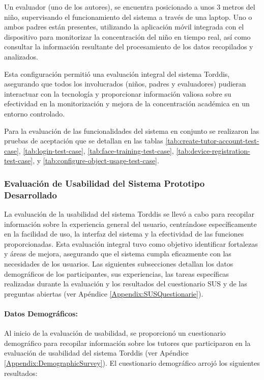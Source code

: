 Un evaluador (uno de los autores), se encuentra posicionado a unos 3 metros del niño, supervisando el funcionamiento del sistema a través de una laptop. Uno o ambos padres están presentes, utilizando la aplicación móvil integrada con el dispositivo para monitorizar la concentración del niño en tiempo real, así como consultar la información resultante del procesamiento de los datos recopilados y analizados.

Esta configuración permitió una evaluación integral del sistema Torddis, asegurando que todos los involucrados (niños, padres y evaluadores) pudieran interactuar con la tecnología y proporcionar información valiosa sobre su efectividad en la monitorización y mejora de la concentración académica en un entorno controlado.

Para la evaluación de las funcionalidades del sistema en conjunto se realizaron las pruebas de aceptación que se detallan en las tablas \ref{tab:create-tutor-account-test-case}, \ref{tab:login-test-case}, \ref{tab:face-training-test-case}, \ref{tab:device-registration-test-case}, y \ref{tab:configure-object-usage-test-case}.

\subsubsection*{Evaluación de Usabilidad del Sistema Prototipo Desarrollado}
La evaluación de la usabilidad del sistema Torddis se llevó a cabo para recopilar información sobre la experiencia general del usuario, centrándose específicamente en la facilidad de uso, la interfaz del sistema y la efectividad de las funciones proporcionadas. Esta evaluación integral tuvo como objetivo identificar fortalezas y áreas de mejora, asegurando que el sistema cumpla eficazmente con las necesidades de los usuarios. Las siguientes subsecciones detallan los datos demográficos de los participantes, sus experiencias, las tareas específicas realizadas durante la evaluación y los resultados del cuestionario SUS y de las preguntas abiertas (ver Apéndice \ref{Appendix:SUSQuestionarie}).

\paragraph{\textbf{Datos Demográficos:}}
Al inicio de la evaluación de usabilidad, se proporcionó un cuestionario demográfico para recopilar información sobre los tutores que participaron en la evaluación de usabilidad del sistema Torddis (ver Apéndice \ref{Appendix:DemographicSurvey}). El cuestionario demográfico arrojó los siguientes resultados:

